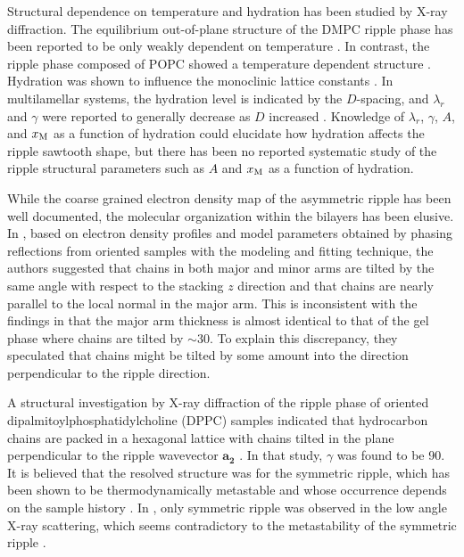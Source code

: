 Structural dependence on temperature and hydration has been studied by X-ray diffraction.
The equilibrium out-of-plane structure of the DMPC ripple phase has been 
reported to be only weakly dependent on temperature \cite{ref:Sengupta03}. 
In contrast, the ripple phase composed of 
\acs{POPC} showed a temperature dependent structure \cite{ref:Sengupta03}.
Hydration was shown to influence the monoclinic 
lattice constants \cite{ref:Wack89}. In multilamellar systems, the hydration
level is indicated by the $D$-spacing, and 
$\lambda_r$ and $\gamma$ were reported to generally decrease as $D$ increased
\cite{ref:Wack89}.
Knowledge of $\lambda_r$, $\gamma$, $A$, and $x_\textrm{M}$ as a function of hydration 
could elucidate how hydration affects the ripple sawtooth shape, but
there has been no reported systematic study of the ripple structural parameters 
such as $A$ and $x_\textrm{M}$ as a function of hydration.  


While the coarse grained electron density map of the asymmetric ripple has been well documented,
the molecular organization within the bilayers has been elusive.
In \cite{ref:Sengupta00,ref:Sengupta03}, based on electron density profiles 
and model parameters obtained by phasing reflections from oriented samples
with the modeling and fitting technique, 
the authors suggested that chains in both major and minor arms are tilted
by the same angle with respect to the stacking $z$ direction and that 
chains are nearly parallel to the local normal in the major arm. 
This is inconsistent with the findings in \cite{ref:Sun96} that
the major arm thickness is almost identical to that of the gel phase where chains 
are tilted by $\sim$30\textdegree. To explain this discrepancy, 
they speculated that chains might be tilted by some amount into the 
direction perpendicular to the ripple direction. 


A structural investigation by X-ray diffraction of the ripple phase of
oriented dipalmitoylphosphatidylcholine (\acs{DPPC}) samples indicated that
hydrocarbon chains are packed in a hexagonal lattice with chains
tilted in the plane perpendicular to the ripple wavevector $\mathbf{a_2}$ \cite{ref:Hentschel91}.
In that study, $\gamma$ was found to be 90\textdegree.
It is believed that the resolved structure was for the symmetric ripple,
which has been shown to be thermodynamically metastable and whose occurrence
depends on the sample history \cite{ref:Katsaras00}. 
In \cite{ref:Hentschel91}, only symmetric ripple was observed in the low angle
X-ray scattering, which seems contradictory to the metastability of the
symmetric ripple \cite{ref:Katsaras00}.

